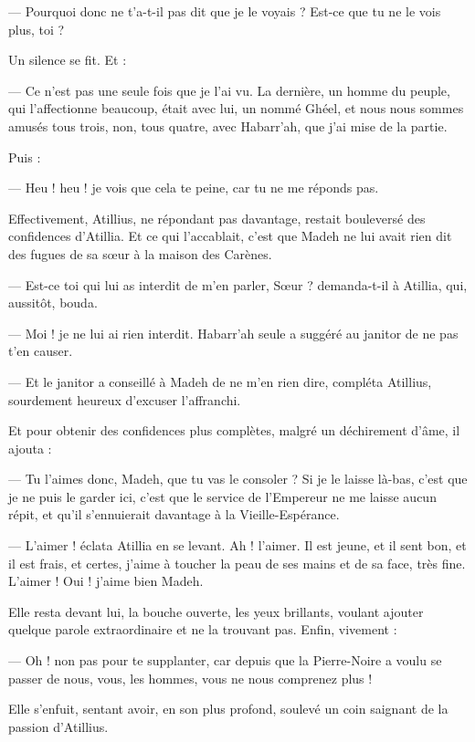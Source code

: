 \documentclass[a4paper, 11pt, oneside, polutonikogreek, french]{article}
\begin{document}
--- Pourquoi donc ne t'a-t-il pas dit que je le voyais ? Est-ce que tu ne le vois plus, toi ?

Un silence se fit. Et :

--- Ce n'est pas une seule fois que je l'ai vu. La dernière, un homme du peuple, qui l'affectionne beaucoup, était avec lui, un nommé Ghéel, et nous nous sommes amusés tous trois, non, tous quatre, avec Habarr'ah, que j'ai mise de la partie.

Puis :

--- Heu ! heu ! je vois que cela te peine, car tu ne me réponds pas.

Effectivement, Atillius, ne répondant pas davantage, restait bouleversé des confidences d'Atillia. Et ce qui l'accablait, c'est que Madeh ne lui avait rien dit des fugues de sa sœur à la maison des Carènes.

--- Est-ce toi qui lui as interdit de m'en parler, Sœur ? demanda-t-il à Atillia, qui, aussitôt, bouda.

--- Moi ! je ne lui ai rien interdit. Habarr'ah seule a suggéré au janitor de ne pas t'en causer.

--- Et le janitor a conseillé à Madeh de ne m'en rien dire, compléta Atillius, sourdement heureux d'excuser l'affranchi.

Et pour obtenir des confidences plus complètes, malgré un déchirement d'âme, il ajouta :

--- Tu l'aimes donc, Madeh, que tu vas le consoler ? Si je le laisse là-bas, c'est que je ne puis le garder ici, c'est que le service de l'Empereur ne me laisse aucun répit, et qu'il s'ennuierait davantage à la Vieille-Espérance.

--- L'aimer ! éclata Atillia en se levant. Ah ! l'aimer. Il est jeune, et il sent bon, et il est frais, et certes, j'aime à toucher la peau de ses mains et de sa face, très fine. L'aimer ! Oui ! j'aime bien Madeh.

Elle resta devant lui, la bouche ouverte, les yeux brillants, voulant ajouter quelque parole extraordinaire et ne la trouvant pas. Enfin, vivement :

--- Oh ! non pas pour te supplanter, car depuis que la Pierre-Noire a voulu se passer de nous, vous, les hommes, vous ne nous comprenez plus !

Elle s'enfuit, sentant avoir, en son plus profond, soulevé un coin saignant de la passion d'Atillius.
\clearpage
\subsection{}
\end{document}
